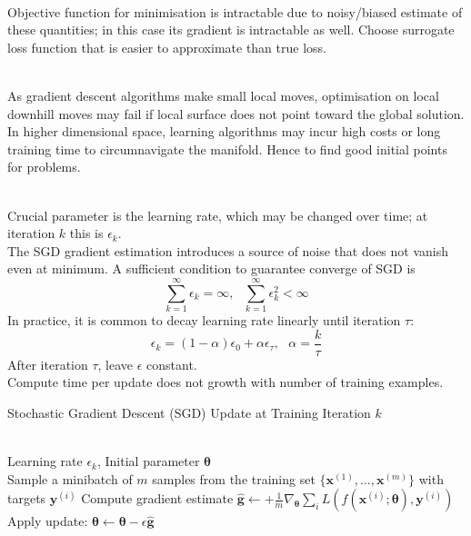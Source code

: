 \begin{remark} \\
Objective function for minimisation is intractable due to noisy/biased estimate of these quantities; in this case its gradient is intractable as well. Choose surrogate loss function that is easier to approximate than true loss.
\end{remark}

\begin{remark} \\
As gradient descent algorithms make small local moves, optimisation on local downhill moves may fail if local surface does not point toward the global solution. In higher dimensional space, learning algorithms may incur high costs or long training time to circumnavigate the manifold. Hence to find good initial points for problems.
\end{remark}

\begin{remark} \\
Crucial parameter is the learning rate, which may be changed over time; at iteration $k$ this is $\epsilon_k$.\\
The SGD gradient estimation introduces a source of noise that does not vanish even at minimum. A sufficient condition to guarantee converge of SGD is
\begin{equation}
\sum\limits_{k=1}^{\infty} \epsilon_k = \infty, \ \ \ \sum\limits_{k=1}^{\infty} \epsilon_k^2 < \infty \nonumber
\end{equation}
In practice, it is common to decay learning rate linearly until iteration $\tau$:
\begin{equation}
\epsilon_k = (1- \alpha)\epsilon_0 + \alpha \epsilon_{\tau}, \ \ \ \alpha = \frac{k}{\tau} \nonumber
\end{equation}
After iteration $\tau$, leave $\epsilon$ constant.\\
Compute time per update does not growth with number of training examples.
\end{remark}

\begin{breakablealgorithm}
\caption{Stochastic Gradient Descent (SGD) Update at Training Iteration $k$}
\begin{algorithmic}
\Require \\
Learning rate $\epsilon_k$, Initial parameter $\bm{\theta}$\\

\State Sample a minibatch of $m$ samples from the training set $\{\bm{x}^{(1)}, \ldots, \bm{x}^{(m)} \}$ with targets $\bm{y}^{(i)}$
\State Compute gradient estimate $\hat{\bm{g}} \leftarrow + \frac{1}{m} \nabla_{\bm{\theta}} \sum_{i} L(f(\bm{x}^{(i)}; \bm{\theta}), \bm{y}^{(i)})$
\State Apply update: $\bm{\theta} \leftarrow \bm{\theta} - \epsilon \hat{\bm{g}}$
\EndWhile
\end{algorithmic}
\end{breakablealgorithm}

